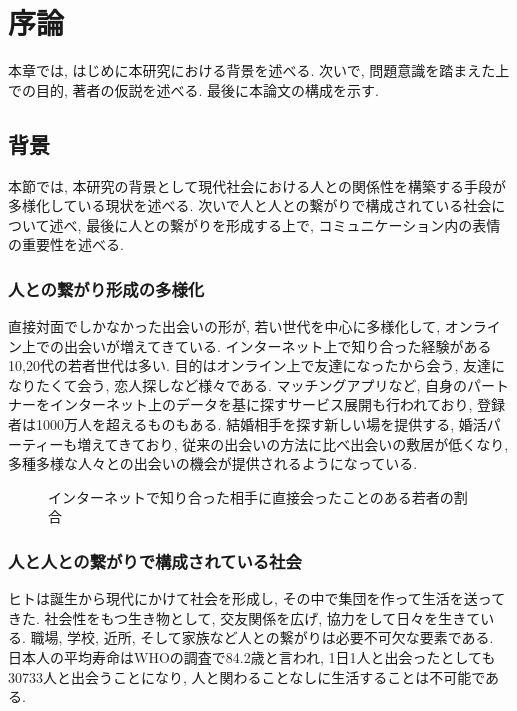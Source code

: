 \chapter{序論}
\label{chap:introduction}

本章では, はじめに本研究における背景を述べる.
次いで, 問題意識を踏まえた上での目的, 著者の仮説を述べる.
最後に本論文の構成を示す.

\section{背景}
本節では, 本研究の背景として現代社会における人との関係性を構築する手段が多様化している現状を述べる.
次いで人と人との繋がりで構成されている社会について述べ,
最後に人との繋がりを形成する上で, コミュニケーション内の表情の重要性を述べる.


\subsection{人との繋がり形成の多様化}
直接対面でしかなかった出会いの形が, 若い世代を中心に多様化して, オンライン上での出会いが増えてきている.
インターネット上で知り合った経験がある10,20代の若者世代は多い\cite{mandom}.
目的はオンライン上で友達になったから会う, 友達になりたくて会う, 恋人探しなど様々である.
マッチングアプリなど, 自身のパートナーをインターネット上のデータを基に探すサービス展開も行われており,
登録者は1000万人を超えるものもある.
結婚相手を探す新しい場を提供する, 婚活パーティーも増えてきており\cite{chane_claire},
従来の出会いの方法に比べ出会いの敷居が低くなり,多種多様な人々との出会いの機会が提供されるようになっている.

\begin{figure}[htbp]
    \begin{center}
    \end{center}
    \caption{インターネットで知り合った相手に直接会ったことのある若者の割合}
    \label{fig:onlinemeeting_to_real}
\end{figure}

\subsection{人と人との繋がりで構成されている社会}
ヒトは誕生から現代にかけて社会を形成し, その中で集団を作って生活を送ってきた.
社会性をもつ生き物として, 交友関係を広げ, 協力をして日々を生きている.
職場, 学校, 近所, そして家族など人との繋がりは必要不可欠な要素である.
日本人の平均寿命はWHOの調査で84.2歳\cite{WHO_reserch}と言われ,
1日1人と出会ったとしても30733人と出会うことになり, 人と関わることなしに生活することは不可能である.


